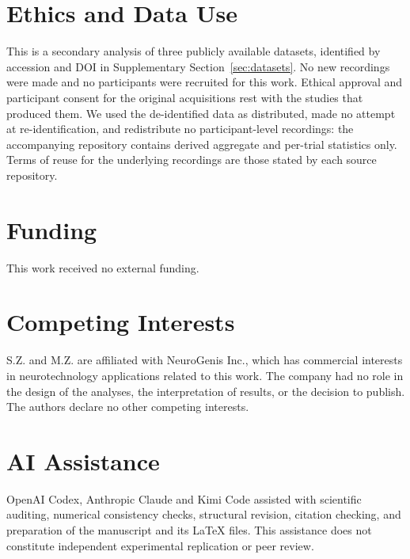 \section*{Ethics and Data Use}
This is a secondary analysis of three publicly available datasets, identified by accession and DOI in Supplementary Section~\ref{sec:datasets}. No new recordings were made and no participants were recruited for this work. Ethical approval and participant consent for the original acquisitions rest with the studies that produced them. We used the de-identified data as distributed, made no attempt at re-identification, and redistribute no participant-level recordings: the accompanying repository contains derived aggregate and per-trial statistics only. Terms of reuse for the underlying recordings are those stated by each source repository.

\section*{Funding}
This work received no external funding.

\section*{Competing Interests}
S.Z. and M.Z. are affiliated with NeuroGenis Inc., which has commercial interests in neurotechnology applications related to this work. The company had no role in the design of the analyses, the interpretation of results, or the decision to publish. The authors declare no other competing interests.

\section*{AI Assistance}
OpenAI Codex, Anthropic Claude and Kimi Code assisted with scientific auditing, numerical consistency checks, structural revision, citation checking, and preparation of the manuscript and its LaTeX files. This assistance does not constitute independent experimental replication or peer review.

